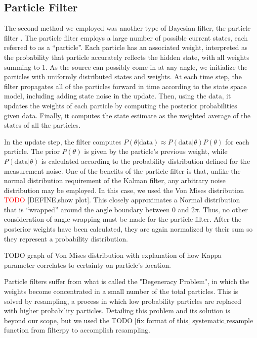 \documentclass[11pt]{amsart}
\begin{document}

\subsection{Particle Filter}
The second method we employed was another type of Bayesian filter, the particle filter \cite{Particle}. The particle filter employs a large number of possible current states, each referred to 
as a “particle”. Each particle has an associated weight, interpreted as the probability that particle accurately reflects the hidden state, with all weights summing to 1. As the source can possibly 
come in at any angle, we initialize the particles with uniformly distributed states and weights. At each time step, the filter propagates all of the particles forward in time according to the state space 
model, including adding state noise in the update. Then, using the data, it updates the weights of each particle by computing the posterior probabilities given data. Finally, it computes the state estimate 
as the weighted average of the states of all the particles. 

In the update step, the filter computes $P(\theta|\text{data}) \approx P(\text{data}|\theta)P(\theta)$ for each particle. The prior $P(\theta)$ is given by the particle’s previous weight, while $P(\text{data}|\theta)$ is calculated 
according to the probability distribution defined for the measurement noise. One of the benefits of the particle filter is that, unlike the normal distribution requirement of the Kalman filter, any arbitrary noise 
distribution may be employed. In this case, we used the Von Mises distribution \textcolor{red}{TODO} [DEFINE,show plot]. This closely approximates a Normal distribution that is “wrapped” around the angle boundary between $0$ and $2\pi$. 
Thus, no other consideration of angle wrapping must be made for the particle filter. After the posterior weights have been calculated, they are again normalized by their sum so they represent a probability distribution.

TODO graph of Von Mises distribution with explanation of how Kappa parameter 
correlates to certainty on particle's location.

Particle filters suffer from what is called the "Degeneracy Problem", in which the weights become concentrated in a small number of the total particles. This is solved by resampling, a process in which low probability particles are replaced 
with higher probability particles. Detailing this problem and its solution is beyond our scope, but we used the TODO [fix format of this] $\text{systematic\_resample}$ function from $\text{filterpy}$ to accomplish resampling.
\end{document}
